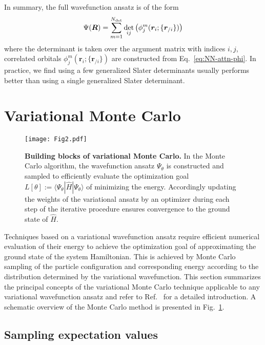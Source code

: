 \documentclass[
 reprint,
 amsmath,amssymb,
 aps, prx,
floatfix,longbibliography,
]{revtex4-2}
\begin{document}
In summary, the full wavefunction ansatz is of the form
\begin{equation}
    \Psi(\bm R) = \sum_{m = 1}^{N_{\rm det}} \det_{ij} \left( \phi_j^m(\bm r_i; \{\bm r_{/i}\}) \right)
    \label{eq:NN-attn-final-ansatz}
\end{equation}
where the determinant is taken over the argument matrix with indices $i, j$, correlated orbitals $\phi_j^m(\bm r_i; \{\bm r_{/i}\})$ are constructed from Eq.~\eqref{eq:NN-attn-phi}.
In practice, we find using a few generalized Slater determinants usually performs better than using a single generalized Slater determinant. 


\section{Variational Monte Carlo}
\label{sec:VMC}

\begin{figure}
    \centering
    \texttt{[image: Fig2.pdf]}
    \caption{\textbf{Building blocks of variational Monte Carlo.} 
    In the Monte Carlo algorithm, the wavefunction ansatz $\Psi_\theta$ is constructed and sampled to  efficiently evaluate the optimization goal $L[\theta] := \langle \Psi_\theta|\hat{H}|\Psi_\theta\rangle$ of minimizing the energy. 
    Accordingly updating the weights of the variational ansatz by an optimizer during each step of the iterative procedure ensures convergence to the ground state of $\hat{H}$.
    }
    \label{fig:2}
\end{figure}

Techniques based on a variational wavefunction ansatz require efficient numerical evaluation of their energy to achieve the optimization goal of approximating the ground state of the system Hamiltonian. This is achieved by Monte Carlo sampling of the particle configuration and corresponding energy according to the distribution determined by the variational wavefunction.
This section summarizes the principal concepts of the variational Monte Carlo technique applicable to any variational wavefunction ansatz and refer to Ref.~\cite{Foulkes2001Jan} for a detailed introduction. 
A schematic overview of the Monte Carlo method is presented in Fig.~\ref{fig:2}. 


\subsection{Sampling expectation values}
\end{document}
